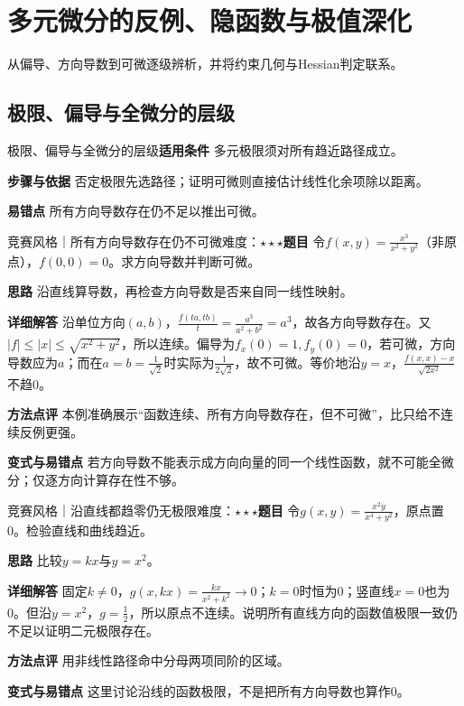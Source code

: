 \section{多元微分的反例、隐函数与极值深化}\label{deep:multivariable_source_deep}

\begin{examtip}从偏导、方向导数到可微逐级辨析，并将约束几何与Hessian判定联系。\end{examtip}

\subsection{极限、偏导与全微分的层级}\label{deep:multivariable_source_deep:differentiable}

\begin{method}{极限、偏导与全微分的层级}\textbf{适用条件} 多元极限须对所有趋近路径成立。\par\textbf{步骤与依据} 否定极限先选路径；证明可微则直接估计线性化余项除以距离。\par\textbf{易错点} 所有方向导数存在仍不足以推出可微。\end{method}

\begin{example}{竞赛风格｜所有方向导数存在仍不可微}{难度：$\star\star\star$}\label{deep:ex:multivariable_source_deep:directioncounter}\textbf{题目} 令$f(x,y)=\frac{x^3}{x^2+y^2}$（非原点），$f(0,0)=0$。求方向导数并判断可微。\par\textbf{思路} 沿直线算导数，再检查方向导数是否来自同一线性映射。\par\textbf{详细解答} 沿单位方向$(a,b)$，$\frac{f(ta,tb)}{t}=\frac{a^3}{a^2+b^2}=a^3$，故各方向导数存在。又$|f|\le|x|\le\sqrt{x^2+y^2}$，所以连续。偏导为$f_x(0)=1,f_y(0)=0$，若可微，方向导数应为$a$；而在$a=b=\frac{1}{\sqrt2}$时实际为$\frac{1}{2\sqrt2}$，故不可微。等价地沿$y=x$，$\frac{f(x,x)-x}{\sqrt{2x^2}}$不趋0。\par\textbf{方法点评} 本例准确展示“函数连续、所有方向导数存在，但不可微”，比只给不连续反例更强。\par\textbf{变式与易错点} 若方向导数不能表示成方向向量的同一个线性函数，就不可能全微分；仅逐方向计算存在性不够。\end{example}

\begin{example}{竞赛风格｜沿直线都趋零仍无极限}{难度：$\star\star\star$}\label{deep:ex:multivariable_source_deep:discontinuous}\textbf{题目} 令$g(x,y)=\frac{x^2y}{x^4+y^2}$，原点置0。检验直线和曲线趋近。\par\textbf{思路} 比较$y=kx$与$y=x^2$。\par\textbf{详细解答} 固定$k\ne0$，$g(x,kx)=\frac{kx}{x^2+k^2}\to0$；$k=0$时恒为0；竖直线$x=0$也为0。但沿$y=x^2$，$g=\frac{1}{2}$，所以原点不连续。说明所有直线方向的函数值极限一致仍不足以证明二元极限存在。\par\textbf{方法点评} 用非线性路径命中分母两项同阶的区域。\par\textbf{变式与易错点} 这里讨论沿线的函数极限，不是把所有方向导数也算作0。\end{example}

